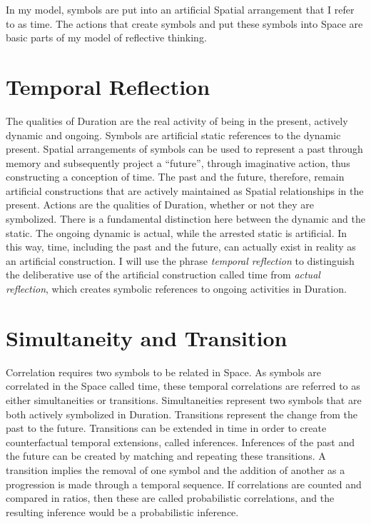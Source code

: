 In my model, symbols are put into an artificial Spatial arrangement
that I refer to as time.  The actions that create symbols and put
these symbols into Space are basic parts of my model of reflective
thinking.

\section{Temporal Reflection}

The qualities of Duration are the real activity of being in the
present, actively dynamic and ongoing.  Symbols are artificial static
references to the dynamic present.  Spatial arrangements of symbols
can be used to represent a past through memory and subsequently
project a ``future'', through imaginative action, thus constructing a
conception of time.  The past and the future, therefore, remain
artificial constructions that are actively maintained as Spatial
relationships in the present.  Actions are the qualities of Duration,
whether or not they are symbolized.  There is a fundamental
distinction here between the dynamic and the static.  The ongoing
dynamic is actual, while the arrested static is artificial.  In this
way, time, including the past and the future, can actually exist in
reality as an artificial construction.  I will use the phrase
\emph{temporal reflection} to distinguish the deliberative use of the
artificial construction called time from \emph{actual reflection},
which creates symbolic references to ongoing activities in Duration.

\section{Simultaneity and Transition}

Correlation requires two symbols to be related in Space.  As symbols
are correlated in the Space called time, these temporal correlations
are referred to as either simultaneities or transitions.
Simultaneities represent two symbols that are both actively symbolized
in Duration.  Transitions represent the change from the past to the
future.  Transitions can be extended in time in order to create
counterfactual temporal extensions, called inferences.  Inferences of
the past and the future can be created by matching and repeating these
transitions.  A transition implies the removal of one symbol and the
addition of another as a progression is made through a temporal
sequence.  If correlations are counted and compared in ratios, then
these are called probabilistic correlations, and the resulting
inference would be a probabilistic inference.

